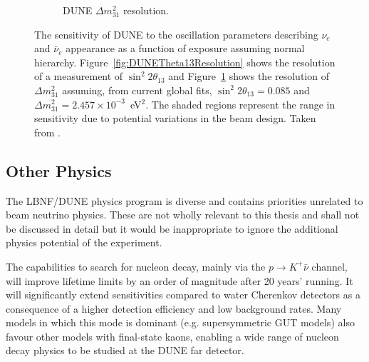\begin{figure}
\begin{subfigure}[t]{0.48\linewidth}
    \caption{DUNE $\Delta m_{31}^2$ resolution.}
    \label{fig:DUNEDeltaM31Resolution}
  \end{subfigure}
  \caption[The sensitivity of DUNE to the oscillation parameters describing $\nu_e$ and $\bar{\nu}_e$ appearance.]{The sensitivity of DUNE to the oscillation parameters describing $\nu_e$ and $\bar{\nu}_e$ appearance as a function of exposure assuming normal hierarchy.  Figure~\ref{fig:DUNETheta13Resolution} shows the resolution of a measurement of $\sin^2{2\theta_{13}}$ and Figure~\ref{fig:DUNEDeltaM31Resolution} shows the resolution of $\Delta m_{31}^2$ assuming, from current global fits, $\sin^2{2\theta_{13}}=0.085$ and $\Delta m_{31}^2=2.457\times10^{-3}$~eV$^2$.  The shaded regions represent the range in sensitivity due to potential variations in the beam design.  Taken from \cite{DUNECDR2}.}
  \label{fig:DUNETheta13}
\end{figure}

\subsection{Other Physics}\label{sec:DUNEOtherPhysics}

The LBNF/DUNE physics program is diverse and contains priorities unrelated to beam neutrino physics.  These are not wholly relevant to this thesis and shall not be discussed in detail but it would be inappropriate to ignore the additional physics potential of the experiment.

The capabilities to search for nucleon decay, mainly via the $p\rightarrow K^+\bar{\nu}$ channel, will improve lifetime limits by an order of magnitude after 20 years' running.  It will significantly extend sensitivities compared to water Cherenkov detectors as a consequence of a higher detection efficiency and low background rates.  Many models in which this mode is dominant (e.g. supersymmetric GUT models) also favour other models with final-state kaons, enabling a wide range of nucleon decay physics to be studied at the DUNE far detector.

